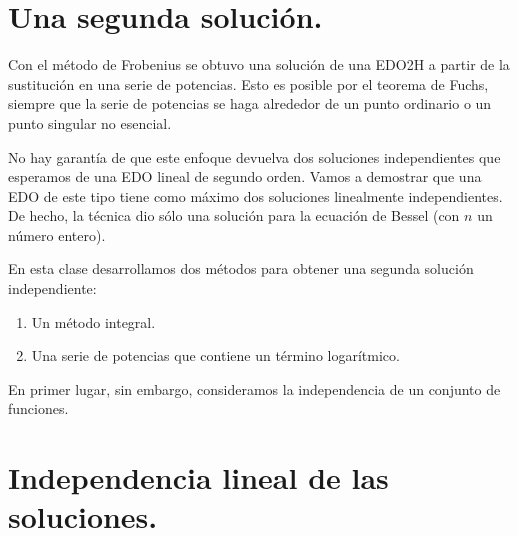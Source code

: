 
\section{Una segunda solución.}

Con el método de Frobenius se obtuvo una solución de una EDO2H a partir de la sustitución en una serie de potencias. Esto es posible por el teorema de Fuchs, siempre que la serie de potencias se haga alrededor de un punto ordinario o un punto singular no esencial.
\par
No hay garantía de que este enfoque devuelva dos soluciones independientes que esperamos de una EDO lineal de segundo orden. Vamos a demostrar que una EDO de este tipo tiene como máximo dos soluciones linealmente independientes. De hecho, la técnica dio sólo una solución para la ecuación de Bessel (con $n$ un número entero).
\par
En esta clase desarrollamos dos métodos para obtener una segunda solución independiente:
\begin{enumerate}
\item Un método integral.
\item Una serie de potencias que contiene un término logarítmico.
\end{enumerate}
En primer lugar, sin embargo, consideramos la independencia de un conjunto de funciones.

\section{Independencia lineal de las soluciones.}


